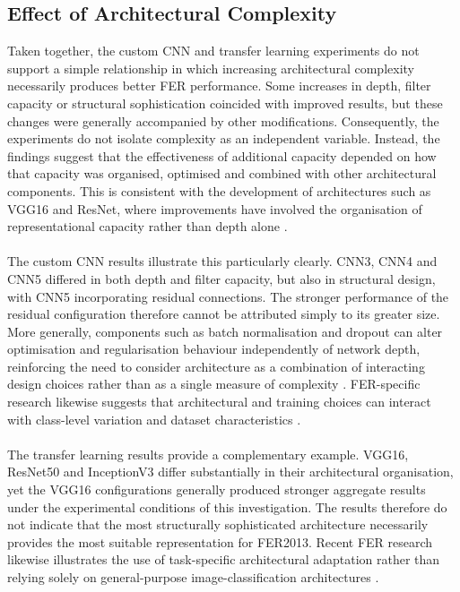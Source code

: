 \documentclass[12pt, a4paper]{report}
\let\oldsubsection\subsection
\renewcommand{\subsection}{%
    \Needspace{6\baselineskip}%
    \oldsubsection
}
\begin{document}
			\newpage
			\subsection{Effect of Architectural Complexity}
				
				Taken together, the custom CNN and transfer learning experiments do not support a simple relationship in which increasing architectural complexity necessarily produces better FER performance. Some increases in depth, filter capacity or structural sophistication coincided with improved results, but these changes were generally accompanied by other modifications. Consequently, the experiments do not isolate complexity as an independent variable. Instead, the findings suggest that the effectiveness of additional capacity depended on how that capacity was organised, optimised and combined with other architectural components. This is consistent with the development of architectures such as VGG16 and ResNet, where improvements have involved the organisation of representational capacity rather than depth alone \cite{simonyan2015vgg, he2016resnet}.\\\\
				The custom CNN results illustrate this particularly clearly. CNN3, CNN4 and CNN5 differed in both depth and filter capacity, but also in structural design, with CNN5 incorporating residual connections. The stronger performance of the residual configuration therefore cannot be attributed simply to its greater size. More generally, components such as batch normalisation and dropout can alter optimisation and regularisation behaviour independently of network depth, reinforcing the need to consider architecture as a combination of interacting design choices rather than as a single measure of complexity \cite{ioffe2015batch, srivastava2014dropout}. FER-specific research likewise suggests that architectural and training choices can interact with class-level variation and dataset characteristics \cite{Pham2023InterIntraFER}.\\\\
				The transfer learning results provide a complementary example. VGG16, ResNet50 and InceptionV3 differ substantially in their architectural organisation, yet the VGG16 configurations generally produced stronger aggregate results under the experimental conditions of this investigation. The results therefore do not indicate that the most structurally sophisticated architecture necessarily provides the most suitable representation for FER2013. Recent FER research likewise illustrates the use of task-specific architectural adaptation rather than relying solely on general-purpose image-classification architectures \cite{Khan2026IAENet}.\\\\
\end{document}
